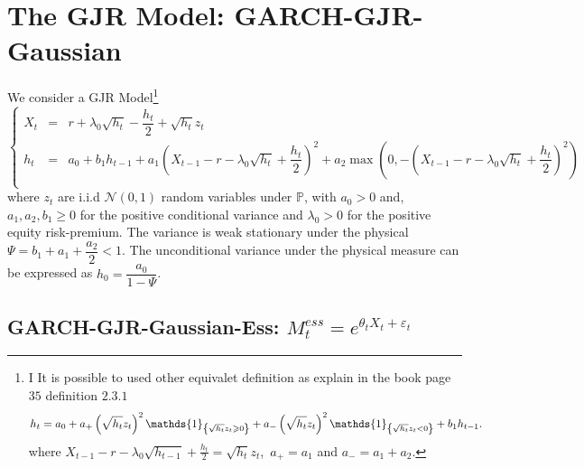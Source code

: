 \documentclass[preprint,times,12pt]{elsarticle}
\begin{document}
\section{The GJR  Model: GARCH-GJR-Gaussian}

We consider a GJR Model\footnote{I
It is possible to used other equivalet definition as explain in the book page $35$  definition $2.3.1$ 
\begin{equation*}\label{GJR}
h_{t}= a_{0}+a_{+} \left(\sqrt{h_{t}}z_{t}\right)^{2}\mathds{1}_{\left\lbrace \sqrt{h_{t}}z_{t}\geqslant 0\right\rbrace }+a_{-} \left(\sqrt{h_{t}}z_{t}\right)^{2}\mathds{1}_{\left\lbrace \sqrt{h_{t}}z_{t}< 0\right\rbrace }+b_{1}h_{t-1}.\\
\end{equation*} 
where $  X_{t-1}-  r -\lambda_{0}\sqrt{h_{t-1}}+\frac{h_{t}}{2}= \sqrt{h_{t}}z_{t} $,\  $a_{+}=a_{1}$ and $a_{-}=a_{1}+a_{2}$.}
 \begin{equation*}
\left\{
  \begin{array}{rcl}
X_{t}& = & r+\lambda_{0}\sqrt{h_{t}}-\dfrac{h_{t}}{2}+\sqrt{h_{t}}z_{t}\\
h_{t}& = & a_{0}+b_{1}h_{t-1}+a_{1} \left(X_{t-1}-  r -\lambda_{0}\sqrt{h_{t}}+\dfrac{h_{t}}{2}\right)^{2}
+a_{2} \max\left( 0, - \left(X_{t-1}-  r -\lambda_{0}\sqrt{h_{t}}+\dfrac{h_{t}}{2} \right)^{2}\right) \\
  \end{array}
\right.
\end{equation*}
where $ z_{t} $ are i.i.d $ \mathcal{N}(0,1) $ random variables under $ \mathbb{P} $, with $a_{0}> 0$ and, $a_{1}, a_{2}, b_{1}\geqslant 0$ for the positive conditional variance and  $\lambda_{0}> 0$ for the positive equity risk-premium.   The variance is weak stationary under the physical $ \Psi= b_{1}+a_{1}+\dfrac{a_{2}}{2} <1$. The unconditional variance under the physical measure can be expressed as $h_{0}=\dfrac{a_{0}}{1-\Psi}$.




\subsection{ GARCH-GJR-Gaussian-Ess: $M^{ess}_{t}=e^{\theta_{t}X_{t}+\varepsilon_{t}}$}
\end{document}
